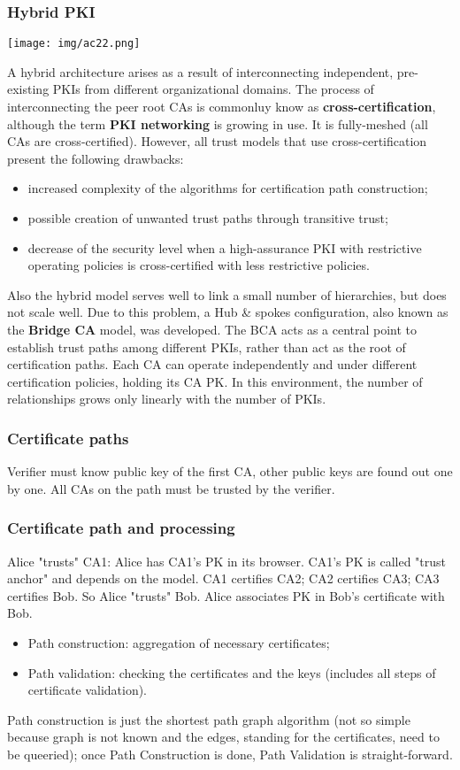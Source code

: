 \documentclass[a4paper, 10pt, titlepage]{article}
\begin{document}
\subsubsection*{Hybrid PKI}
\begin{center}
\texttt{[image: img/ac22.png]}
\end{center}
A hybrid architecture arises as a result of interconnecting independent, pre-existing PKIs from different organizational domains.
The process of interconnecting the peer root CAs is commonluy know as \textbf{cross-certification}, although the term \textbf{PKI networking} is growing in use. It is fully-meshed  (all CAs are cross-certified). However, all trust models that use cross-certification present the following drawbacks:
\begin{itemize}
\item increased complexity of the algorithms for certification path construction;
\item possible creation of unwanted trust paths through transitive trust;
\item decrease of the security level when a high-assurance PKI with restrictive operating policies is cross-certified with less restrictive policies.
\end{itemize}
Also the hybrid model serves well to link a small number of hierarchies, but does not scale well. Due to this problem, a Hub \& spokes configuration, also known as the \textbf{Bridge CA} model, was developed. The BCA acts as a central point to establish trust paths among different PKIs, rather than act as the root of certification paths. Each CA can operate independently and under different certification policies, holding its CA PK. In this environment, the number of relationships grows only linearly with the number of PKIs.

\subsubsection{Certificate paths}
Verifier must know public key of the first CA, other public keys are found out one by one. All CAs on the path must be trusted by the verifier.
\subsubsection*{Certificate path and processing}
Alice "trusts" CA1: Alice has CA1’s PK in its browser. CA1’s PK is called "trust anchor" and depends on the model. 
CA1 certifies CA2; CA2 certifies CA3; CA3 certifies Bob. So Alice "trusts" Bob. 
Alice associates PK in Bob’s certificate with Bob.
\begin{itemize}
\item Path construction: aggregation of necessary certificates;
\item Path validation: checking the certificates and the keys (includes all steps of certificate validation).
\end{itemize}
Path construction is just the shortest path graph algorithm (not so simple because graph is not known and the edges, standing for the certificates, need to be queeried); once Path Construction is done, Path Validation is straight-forward.
\end{document}
